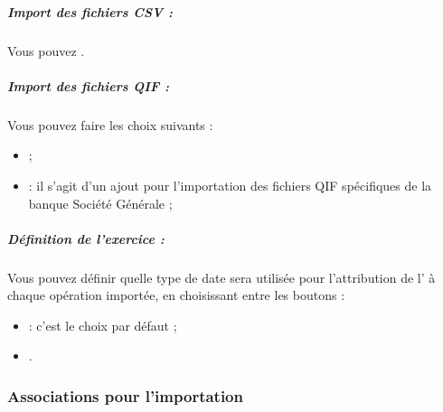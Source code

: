 \subparagraph{Import des fichiers CSV :\label{setup-general-import-files-CSV}}

Vous pouvez .


\subparagraph{Import des fichiers QIF :\label{setup-general-import-files-QIF}}

Vous pouvez faire les choix suivants :

\begin{itemize}
	\item {} ;
	\item {} : il s'agit d'un ajout pour l'importation des fichiers QIF spécifiques de la banque Société Générale ;
		
\end{itemize}


\subparagraph{Définition de l'exercice :\label{setup-general-import-files-financialyear}}

Vous pouvez définir quelle type de date sera utilisée pour l'attribution de l' à chaque opération importée, en choisissant entre les boutons :

\begin{itemize}
	\item {} : c'est le choix par défaut ;     
	\item {}.
\end{itemize}






\subsubsection{Associations pour l'importation\label{setup-general-importlinks}}

